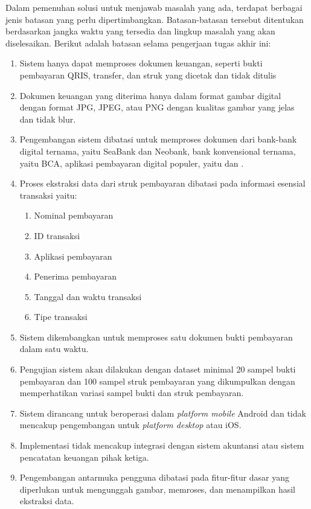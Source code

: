 Dalam pemenuhan solusi untuk menjawab masalah yang ada, terdapat berbagai jenis batasan yang perlu dipertimbangkan. Batasan-batasan tersebut ditentukan berdasarkan jangka waktu yang tersedia dan lingkup masalah yang akan diselesaikan. Berikut adalah batasan selama pengerjaan tugas akhir ini:
\begin{enumerate}
	\item Sistem hanya dapat memproses dokumen keuangan, seperti bukti pembayaran QRIS, transfer, dan struk yang dicetak dan tidak ditulis
	\item Dokumen keuangan yang diterima hanya dalam format gambar digital dengan format JPG, JPEG, atau PNG dengan kualitas gambar yang jelas dan tidak blur.
	\item  Pengembangan sistem dibatasi untuk memproses dokumen dari bank-bank digital ternama, yaitu SeaBank dan Neobank, bank konvensional ternama, yaitu BCA, aplikasi pembayaran digital populer, yaitu dan \gopay{}.
	\item  Proses ekstraksi data dari struk pembayaran dibatasi pada informasi esensial transaksi yaitu:
	      \begin{enumerate}
		      \item Nominal pembayaran
		      \item ID transaksi
		      \item Aplikasi pembayaran
		      \item Penerima pembayaran
		      \item Tanggal dan waktu transaksi
		      \item Tipe transaksi
	      \end{enumerate}
	\item Sistem dikembangkan untuk memproses satu dokumen bukti pembayaran dalam satu waktu.
	\item Pengujian sistem akan dilakukan dengan dataset minimal 20 sampel bukti pembayaran dan 100 sampel struk pembayaran yang dikumpulkan dengan memperhatikan variasi sampel bukti dan struk pembayaran.
	\item Sistem dirancang untuk beroperasi dalam \emph{platform mobile} Android dan tidak mencakup pengembangan untuk \emph{platform desktop} atau iOS.
	\item Implementasi tidak mencakup integrasi dengan sistem akuntansi atau sistem pencatatan keuangan pihak ketiga.
	\item Pengembangan antarmuka pengguna dibatasi pada fitur-fitur dasar yang diperlukan untuk mengunggah gambar, memroses, dan menampilkan hasil ekstraksi data.
\end{enumerate}

